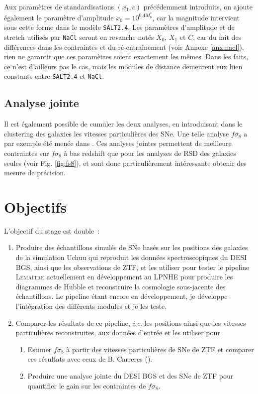 \documentclass{book}
\def\lemaitre{\textsc{Lemaître}\xspace}
\def\nacl{\texttt{NaCl}\xspace}
\def\saltd{\texttt{SALT2.4}\xspace}
\begin{document}
Aux paramètres de standardisations $(x_1, c)$ précédemment introduits, on ajoute également le paramètre d'amplitude $x_0 = 10^{0.4 M^*_b}$, car la magnitude intervient sous cette forme dans le modèle \saltd. Les paramètres d'amplitude et de stretch utilisés par \nacl seront en revanche notés $X_0$, $X_1$ et $C$, car du fait des différences dans les contraintes et du ré-entraînement (voir Annexe \ref{anx:nacl}), rien ne garantit que ces paramètres soient exactement les mêmes. Dans les faits, ce n'est d'ailleurs pas le cas, mais les modules de distance demeurent eux bien constants entre \saltd et \nacl.

\subsection{Analyse jointe }

Il est également possible de cumuler les deux analyses, en introduisant dans le clustering des galaxies les vitesses particulières des SNe. Une telle analyse $f\sigma_8$ a par exemple été menée dans \cite{boruah_bayesian_2022, stahl_peculiar-velocity_2021}. Ces analyses jointes permettent de meilleure contraintes sur $f\sigma_8$ à bas redshift que pour les analyses de RSD des galaxies seules (voir Fig. \ref{fig:fs8}), et sont donc particulièrement intéressante obtenir des mesure de précision.

\section{Objectifs}

L'objectif du stage est double~:
\begin{enumerate}
    \item Produire des échantillons simulés de SNe basés sur les positions des galaxies de la simulation Uchuu qui reproduit les données spectroscopiques du DESI BGS, ainsi que les observations de ZTF, et les utiliser pour tester le pipeline \lemaitre actuellement en développement au LPNHE pour produire les diagrammes de Hubble et reconstruire la cosmologie sous-jacente des échantillons. Le pipeline étant encore en développement, je développe l'intégration des différents modules et je les teste.
    \item Comparer les résultats de ce pipeline, \textit{i.e.} les positions ainsi que les vitesses particulières reconstruites, aux données d'entrée et les utiliser pour
    	\begin{enumerate}
		\item Estimer $f \sigma_8$ à partir des vitesses particulières de SNe de ZTF et comparer ces résultats avec ceux de B. Carreres (\cite{carreres_growth-rate_2023}).
		\item Produire une analyse jointe du DESI BGS et des SNe de ZTF pour quantifier le gain sur les contraintes de $f\sigma_8$.
	\end{enumerate}
\end{enumerate}
\end{document}
